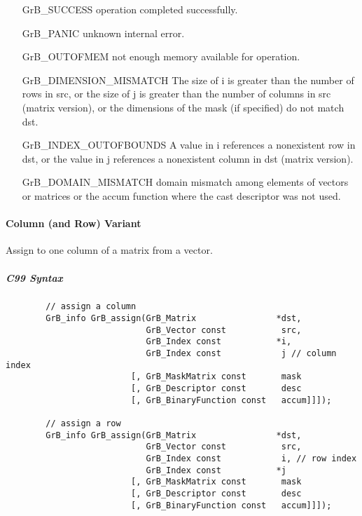 \begin{itemize}[leftmargin=2.1in]
\item[{\sf GrB\_SUCCESS}]      operation completed successfully.
\item[{\sf GrB\_PANIC}]        unknown internal error.
\item[{\sf GrB\_OUTOFMEM}]     not enough memory available for operation.
\item[{\sf GrB\_DIMENSION\_MISMATCH}] 
        The size of i is greater than the number of rows in src, or
        the size of j is greater than the number of columns in src (matrix version), or
        the dimensions of the mask (if specified) do not match dst.
\item[{\sf GrB\_INDEX\_OUTOFBOUNDS}]
        A value in i references a nonexistent row in dst, or
        the value in j references a nonexistent column in dst (matrix version).
\item[\sf GrB\_DOMAIN\_MISMATCH]  
       domain mismatch among elements of vectors or matrices or the accum function where the cast descriptor was not used.
\end{itemize}


\paragraph{Column (and Row) Variant}

Assign to one column of a matrix from a vector.  

\subparagraph{C99 Syntax}

\begin{verbatim}
        // assign a column
        GrB_info GrB_assign(GrB_Matrix                *dst,
                            GrB_Vector const           src, 
                            GrB_Index const           *i,
                            GrB_Index const            j // column index
                         [, GrB_MaskMatrix const       mask
                         [, GrB_Descriptor const       desc 
                         [, GrB_BinaryFunction const   accum]]]);

        // assign a row
        GrB_info GrB_assign(GrB_Matrix                *dst,
                            GrB_Vector const           src, 
                            GrB_Index const            i, // row index
                            GrB_Index const           *j
                         [, GrB_MaskMatrix const       mask
                         [, GrB_Descriptor const       desc 
                         [, GrB_BinaryFunction const   accum]]]);
\end{verbatim}

